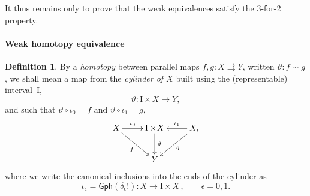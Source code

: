 \documentclass[12pt]{article}
\newcommand{\ra}{\ensuremath{\rightarrow}}
\newcommand{\I}{\ensuremath{\mathrm{I}}}
\theoremstyle{remark}
\theoremstyle{definition}
\newtheorem{definition}[theorem]{Definition}
\begin{document}
It thus remains only to prove that the weak equivalences satisfy the 3-for-2 property.

\paragraph{Weak homotopy equivalence}

\begin{definition}\label{homotopy}
By a \emph{homotopy} between parallel maps $f, g: X\rightrightarrows Y$, written $\vartheta : f \sim g$,  we shall mean a map from the \emph{cylinder of $X$} built using the (representable) interval~$\I$,
\[
\vartheta : \I\times{X} \ra Y,
\]
and such that $\vartheta \circ \iota_0 = f$ and $\vartheta \circ \iota_1 = g$, 
\begin{equation*}%
\xymatrix{
X \ar[r]^-{\iota_0} \ar[rd]_f & \I\times\!{X} \ar[d]^-{\vartheta} & X, \ar[l]_-{\iota_1} \ar[ld]^g \\
& Y &
}
\end{equation*}
where we write the canonical inclusions into the ends of the cylinder as
\[
\iota_\epsilon = \mathsf{Gph}(\delta_\epsilon!) : X\ra \I\times X\,,\qquad \epsilon = 0,1 .
\]  

\end{definition}
\end{document}
